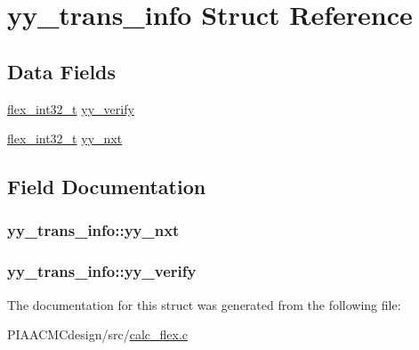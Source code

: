 \hypertarget{structyy__trans__info}{\section{yy\+\_\+trans\+\_\+info Struct Reference}
\label{structyy__trans__info}
}
\subsection*{Data Fields}
\begin{DoxyCompactItemize}
\item 
\hyperlink{PIAACMCdesign_2src_2calc__flex_8c_a838ce943cf44ef7769480714fc6c3ba9}{flex\+\_\+int32\+\_\+t} \hyperlink{structyy__trans__info_a5c9f61e770deef50bd4e697310342fe9}{yy\+\_\+verify}
\item 
\hyperlink{PIAACMCdesign_2src_2calc__flex_8c_a838ce943cf44ef7769480714fc6c3ba9}{flex\+\_\+int32\+\_\+t} \hyperlink{structyy__trans__info_ae0715250c2bef261e596e77e0030f13e}{yy\+\_\+nxt}
\end{DoxyCompactItemize}


\subsection{Field Documentation}
\hypertarget{structyy__trans__info_ae0715250c2bef261e596e77e0030f13e}{
\subsubsection[{yy\+\_\+nxt}]{ yy\+\_\+trans\+\_\+info\+::yy\+\_\+nxt}}\label{structyy__trans__info_ae0715250c2bef261e596e77e0030f13e}
\hypertarget{structyy__trans__info_a5c9f61e770deef50bd4e697310342fe9}{
\subsubsection[{yy\+\_\+verify}]{ yy\+\_\+trans\+\_\+info\+::yy\+\_\+verify}}\label{structyy__trans__info_a5c9f61e770deef50bd4e697310342fe9}


The documentation for this struct was generated from the following file\+:\begin{DoxyCompactItemize}
\item 
P\+I\+A\+A\+C\+M\+Cdesign/src/\hyperlink{PIAACMCdesign_2src_2calc__flex_8c}{calc\+\_\+flex.\+c}\end{DoxyCompactItemize}
